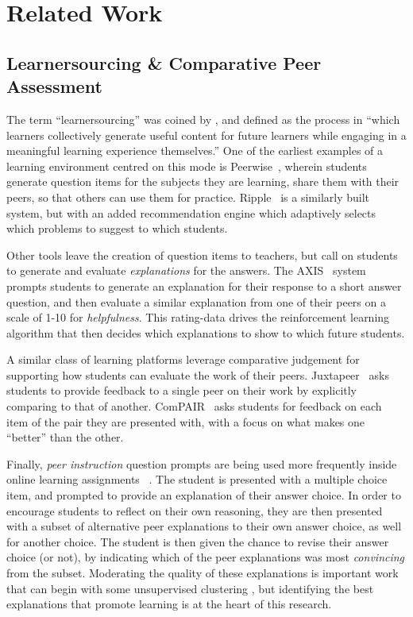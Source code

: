 \documentclass[runningheads]{llncs}
\begin{document}
\section{Related Work}


\subsection{Learnersourcing \& Comparative Peer Assessment}
The term ``learnersourcing'' was coined by \cite{weir_learnersourcing_2015}, 
and defined as the process in ``which learners collectively generate useful 
content for future learners while engaging in a meaningful learning experience 
themselves.'' 
One of the earliest examples of a learning environment centred on this mode is  
Peerwise~\cite{denny_peerwise:_2008}, wherein students generate question items 
for the subjects they are learning, share them with their peers, so that others 
can use them for practice. 
Ripple~\cite{khosravi_ripple_2019} is a similarly built system, but with an 
added recommendation engine which adaptively selects which problems to suggest 
to which students.

Other tools leave the creation of question items to teachers, but call on 
students to generate and evaluate \textit{explanations} for the answers.
The AXIS~\cite{williams_axis:_2016} system prompts students to
generate an explanation for their response to a short answer question, and then 
evaluate a similar explanation from one of their peers on a scale of 1-10 for 
\textit{helpfulness}. This rating-data drives the reinforcement learning 
algorithm that then decides which explanations to show to which future students.

A similar class of learning platforms leverage comparative judgement for 
supporting how students can evaluate the work of their peers. 
Juxtapeer~\cite{cambre_juxtapeer:_2018} asks students to provide feedback to a 
single peer on their work by explicitly comparing to that of another.
ComPAIR~\cite{potter_compair:_2017} asks students for feedback on each item of 
the pair they are presented with, with a focus on what makes one ``better'' 
than the other.

Finally, \textit{peer instruction} question prompts are being used more 
frequently inside online learning 
assignments~\cite{univeristy_of_british_columbia_ubc/ubcpi_2019}
\cite{charles_harnessing_2019}.
The student is presented with a multiple choice item, and prompted to provide 
an explanation of their answer choice. 
In order to encourage students to reflect on their own reasoning, they are then 
presented with a subset of alternative peer explanations to their own answer 
choice, as well for another choice. The student is then given the chance to 
revise their answer choice (or not), by indicating which of the peer 
explanations was most \textit{convincing} from the subset.
Moderating the quality of these explanations is important work that can begin 
with some unsupervised clustering \cite{gagnon_filtering_2019}, but identifying 
the best explanations that promote learning is at the heart of this research.
\end{document}
